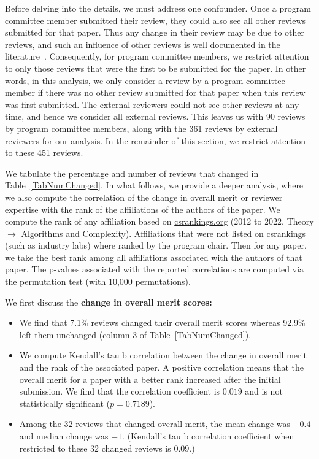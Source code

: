 \documentclass{article}
\newcommand{\rev}[1]{{\color{black}#1}}
\begin{document}
Before delving into the details, we must address one confounder. Once a program committee member submitted their review, they could also see all other reviews submitted for that paper. Thus any change in their review may be due to other reviews, and such an influence of other reviews is well documented in the literature~\cite{teplitskiyasocial}. Consequently, for program committee members, we restrict attention to only those reviews that were the first to be submitted for the paper. In other words, in this analysis, we only consider a review by a program committee member if there was no other review submitted for that paper when this review was first submitted.  The external reviewers could not see other reviews at any time, and hence we consider all external reviews. This leaves us with 90 reviews by program committee members, along with the 361 reviews by external reviewers for our analysis. In the remainder of this section, we restrict attention to these 451 reviews. 

We tabulate the percentage and number of reviews that changed in Table~\ref{TabNumChanged}. In what follows, we provide a deeper analysis, where we also compute the correlation of the change in overall merit or reviewer expertise with the rank of the affiliations of the authors of the paper. We compute the rank of any affiliation based on \url{csrankings.org} (2012 to 2022, Theory $\rightarrow$ Algorithms and Complexity). Affiliations that were not listed on csrankings (such as industry labs) where ranked by the program chair. Then for any paper, we take the best rank among all affiliations associated with the authors of that paper.  The p-values associated with the reported correlations are computed via the permutation test (with 10,000 permutations).

\rev{We first discuss the {\bf change in overall merit scores:} 
\begin{itemize} 
\item We find that 7.1\% reviews changed their overall merit scores whereas 92.9\% left them unchanged (column 3 of Table~\ref{TabNumChanged}). 
\item We compute Kendall's tau b correlation between the change in overall merit and the rank of the associated paper. A positive correlation means that the overall merit for a paper with a better rank increased after the initial submission. We find that the correlation coefficient is $0.019$ and is not statistically significant ($p = 0.7189$). 
\item Among the 32 reviews that changed overall merit, the mean change was $-0.4$ and median change was $-1$.  (Kendall's tau b correlation coefficient when 
 restricted to these 32 changed reviews is $0.09$.)
\end{itemize} 
}
\end{document}
